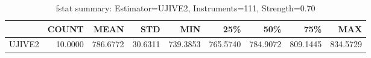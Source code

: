 \begin{table}[ht]
\centering
\caption{fstat summary: Estimator=UJIVE2, Instruments=111, Strength=0.70}
\begin{tabular}{lrrrrrrrr}
\toprule
 & COUNT & MEAN & STD & MIN & 25\% & 50\% & 75\% & MAX \\
\midrule
UJIVE2 & 10.0000 & 786.6772 & 30.6311 & 739.3853 & 765.5740 & 784.9072 & 809.1445 & 834.5729 \\
\bottomrule
\end{tabular}
\end{table}
